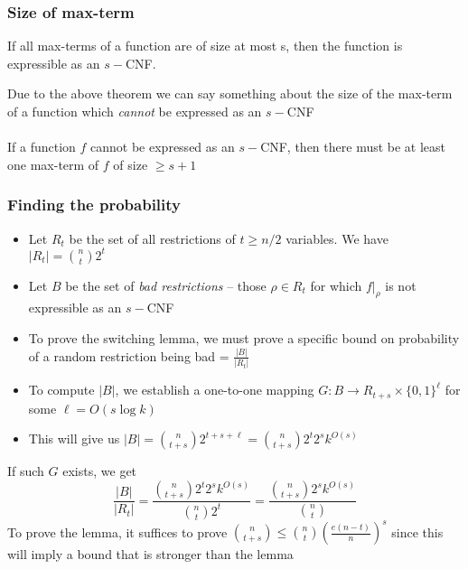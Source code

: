 \documentclass{beamer}[11pt]
\begin{document}

\begin{frame}
\frametitle{Size of max-term}
\begin{theorem}
\label{size}
 If all max-terms of a function are of size at most s, then the function is expressible as an $s-$CNF.

\end{theorem}
Due to the above theorem we can say something about the size of the max-term of a function which \emph{cannot} be expressed as an $s-$CNF
\\~\\

If a function $f$ cannot be expressed as an $s-$CNF, then there must be at least one max-term of $f$ of size $\geq s+1$
\end{frame}

\begin{frame}
\frametitle{Finding the probability}
\begin{itemize}
 \item Let $R_t$ be the set of all restrictions of $t\geq n/2$ variables. We have $|R_t| = \binom{n}{t}2^t $
 \item Let $B$ be the set of \emph{bad restrictions} \--- those $\rho \in R_t$ for which $f|_\rho$ is not expressible as an $s-$CNF
 \item To prove the switching lemma, we must prove a specific bound on probability of a random restriction being bad = $\frac{|B|}{|R_t|}$
 \item To compute $|B|$, we establish a one-to-one mapping $G:B \rightarrow R_{t+s}\times \{0,1\}^\ell $ for some $\ell= O(s\log k) $
 \item This will give us $|B| = \binom{n}{t+s}2^{t+s+\ell} = \binom{n}{t+s}2^t2^sk^{O(s)} $
\end{itemize}
\pause If such $G$ exists, we get
\begin{equation}
 \frac{|B|}{|R_t|} = \frac{\binom{n}{t+s}2^t2^sk^{O(s)}}{\binom{n}{t}2^t } = \frac{\binom{n}{t+s}2^sk^{O(s)} }{\binom{n}{t} }
\end{equation}
To prove the lemma, it suffices to prove $\binom{n}{t+s} \leq \binom{n}{t}\left(\frac{e(n-t) }{n }\right)^s $ since this will imply a bound that is stronger than the lemma
\end{frame}
\end{document}
